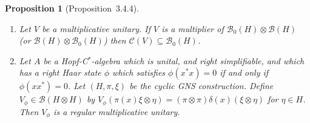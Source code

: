 \documentclass[a4paper,12pt]{article}
\theoremstyle{plain}
\newtheorem{proposition}{Proposition}[section]
\theoremstyle{definition}
\newcommand{\mc}{\mathcal}
\begin{document}
\begin{proposition}[Proposition~3.4.4]\label{prop:12}
\begin{enumerate}
\item\label{prop:12.1} Let $V$ be a multiplicative unitary.  If $V$ is a 
multiplier of $\mc B_0(H) \otimes \mc B(H)$ (or $\mc B(H) \otimes \mc B_0(H)$)
then $\mc C(V) \subseteq \mc B_0(H)$.
\item\label{prop:12.2} Let $A$ be a Hopf-C$^*$-algebra which is unital, and
right simplifiable, and which has a right Haar state $\phi$ which satisfies
$\phi(x^*x)=0$ if and only if $\phi(xx^*)=0$.  Let $(H,\pi,\xi)$ be
the cyclic GNS construction.  Define $V_\phi\in\mc B(H\otimes H)$
by $V_\phi(\pi(x)\xi\otimes\eta) = (\pi\otimes\pi)\delta(x)(\xi\otimes\eta)$
for $\eta\in H$.  Then $V_\phi$ is a regular multiplicative unitary.
\end{enumerate}
\end{proposition}
\end{document}
